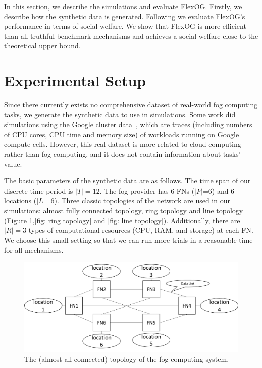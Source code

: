 \documentclass[11pt]{phdthesis}
\begin{document}
In this section, we describe the simulations and evaluate FlexOG. Firstly, we describe how the synthetic data is generated. Following we evaluate FlexOG's performance in terms of social welfare. We show that FlexOG is more efficient than all truthful benchmark mechanisms and achieves a social welfare close to the theoretical upper bound. 

\section{Experimental Setup} \label{experimental setup}

Since there currently exists no comprehensive dataset of real-world fog computing tasks, we generate the synthetic data to use in simulations. Some work did simulations using the Google cluster data~\citep{shi2015shapley,shi2017online,zhang2015truthful}, which are traces (including numbers of CPU cores, CPU time and memory size) of workloads running on Google compute cells. However, this real dataset is more related to cloud computing rather than fog computing, and it does not contain information about tasks' value. 

The basic parameters of the synthetic data are as follows. The time span of our discrete time period is $|T| = 12$. The fog provider has 6 FNs ($|P|$=6) and 6 locations ($|L|$=6). Three classic topologies of the network are used in our simulations: almost fully connected topology, ring topology and line topology (Figure \ref{fig: all connected topology},\ref{fig: ring topology} and \ref{fig: line topology}). Additionally, there are $|R|= 3$ types of computational resources (CPU, RAM, and storage) at each FN. We choose this small setting so that we can run more trials in a reasonable time for all mechanisms.

\begin{figure}
    \centering
    \includegraphics[width=1.0\textwidth]{./Figures/system_topology_allConnected.png}
    \caption{\label{fig: all connected topology}The (almost all connected) topology of the fog computing system.}
\end{figure}
\end{document}
